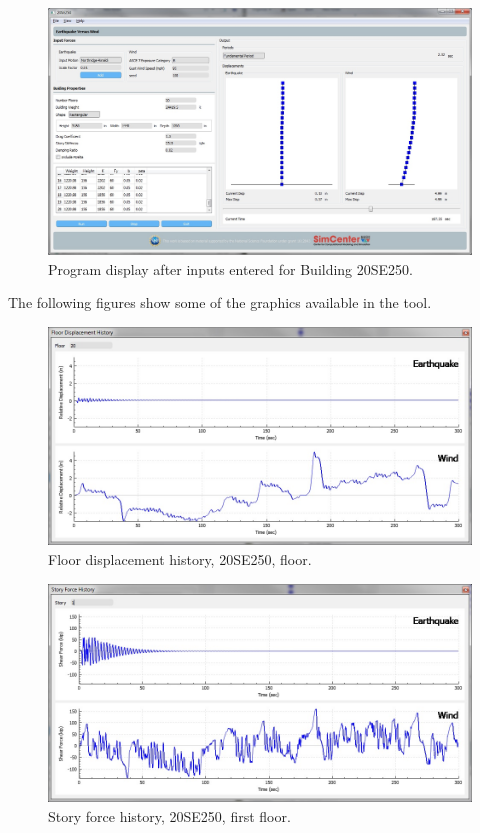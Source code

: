 \documentclass{simcenterdocumentation}
\begin{document}
\begin{figure}[H]
	\centering \includegraphics[width=0.9\linewidth]{20SE250_1.jpg}
	\caption{Program display after inputs entered for Building 20SE250.}
\end{figure}
The following figures show some of the graphics available in the tool.
\begin{figure}[H]
	\centering \includegraphics[scale=0.35]{20SE250_fdh.jpg}
	\caption{Floor displacement history, 20SE250,  floor.}
\end{figure}
\begin{figure}[H]
	\centering \includegraphics[scale=0.35]{20SE250_sfh.jpg}
	\caption{Story force history, 20SE250, first floor.}
\end{figure}
\end{document}
